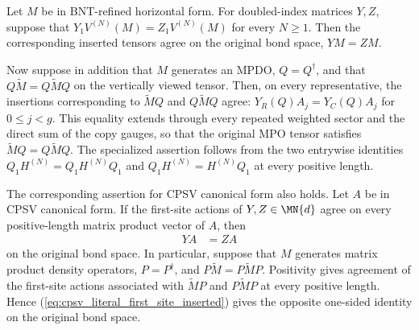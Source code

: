 \begin{lemma}
    \label{thm:representative_one_sub_mp_zero}
    \leanok
    Let $M$ be in BNT-refined horizontal form. For doubled-index
    matrices
    $Y,Z$, suppose that
    $Y_1V^{(N)}(M)=Z_1V^{(N)}(M)$ for every $N\geq1$.
    Then the corresponding inserted tensors agree on the original bond
    space, $YM=ZM$.

    Now suppose in addition that $M$ generates an MPDO, $Q=Q^\dagger$, and
    that $Q\widetilde M=Q\widetilde M Q$ on the vertically viewed tensor.
    Then, on every representative, the insertions corresponding to
    $\widetilde M Q$ and $Q\widetilde M Q$ agree:
    $Y_R(Q)A_j=Y_C(Q)A_j$ for $0\leq j<g$.
    This equality extends through every repeated weighted sector and the
    direct sum of the copy gauges, so that the original MPO tensor satisfies
    $\widetilde M Q=Q\widetilde M Q$.
    The specialized assertion follows from the two entrywise identities
    $Q_1H^{(N)}=Q_1H^{(N)}Q_1$ and
    $Q_1H^{(N)}=H^{(N)}Q_1$ at every positive length.

    The corresponding assertion for CPSV canonical form also holds. Let $A$ be in
    CPSV canonical form. If the first-site actions of $Y,Z\in\MN{d}$
    agree on every positive-length matrix product vector of $A$, then
    \begin{align}
        YA & =ZA
        \label{eq:cpsv_literal_first_site_inserted}
    \end{align}
    on the original bond space. In particular, suppose that $M$ generates
    matrix product density operators, $P=P^\dagger$, and
    $P\widetilde M=P\widetilde MP$. Positivity gives agreement of the
    first-site actions associated with $\widetilde MP$ and
    $P\widetilde MP$ at every positive length. Hence
    (\ref{eq:cpsv_literal_first_site_inserted}) gives the opposite one-sided
    identity on the original bond space.


\end{lemma}
